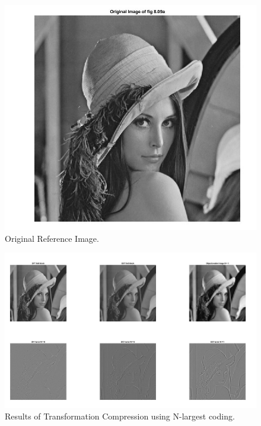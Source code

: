 \documentclass[./rarnold_project6.tex]{subfiles}
\begin{document}
	\begin{figure}[!htbp]
	\centering
	\includegraphics[scale=0.50]{"original"}
	\captionsetup{justification=centering}
	\caption{Original Reference Image.} 
	\label{orig}
	\end{figure}
	
	\clearpage
	
	\begin{figure}[!htbp]
	\centering
	\includegraphics[scale=0.33]{"transform"}
	\captionsetup{justification=centering}
	\caption{Results of Transformation Compression using N-largest coding.} 
	\label{xform}
	\end{figure}
	
	\clearpage 
	
\end{document}
